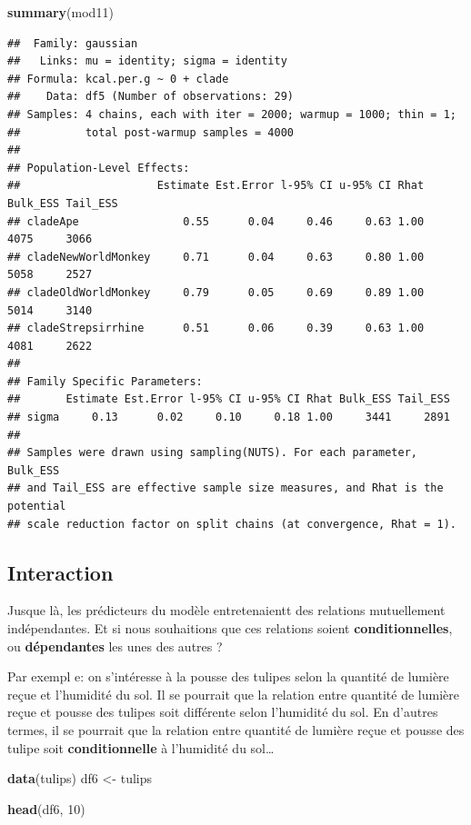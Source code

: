 \documentclass[
  a4paper,11pt,twoside,onecolumn,openright,final,oldfontcommands]{memoir}
\newenvironment{Shaded}{\begin{snugshade}}{\end{snugshade}}
\newcommand{\DecValTok}[1]{\textcolor[rgb]{0.00,0.00,0.81}{#1}}
\newcommand{\KeywordTok}[1]{\textcolor[rgb]{0.13,0.29,0.53}{\textbf{#1}}}
\newcommand{\NormalTok}[1]{#1}
\newcommand{\StringTok}[1]{\textcolor[rgb]{0.31,0.60,0.02}{#1}}
\theoremstyle{definition}
\theoremstyle{definition}
\theoremstyle{definition}
\theoremstyle{remark}
\begin{document}
\begin{Shaded}
\begin{Highlighting}[]
\KeywordTok{summary}\NormalTok{(mod11)}
\end{Highlighting}
\end{Shaded}

\begin{verbatim}
##  Family: gaussian 
##   Links: mu = identity; sigma = identity 
## Formula: kcal.per.g ~ 0 + clade 
##    Data: df5 (Number of observations: 29) 
## Samples: 4 chains, each with iter = 2000; warmup = 1000; thin = 1;
##          total post-warmup samples = 4000
## 
## Population-Level Effects: 
##                     Estimate Est.Error l-95% CI u-95% CI Rhat Bulk_ESS Tail_ESS
## cladeApe                0.55      0.04     0.46     0.63 1.00     4075     3066
## cladeNewWorldMonkey     0.71      0.04     0.63     0.80 1.00     5058     2527
## cladeOldWorldMonkey     0.79      0.05     0.69     0.89 1.00     5014     3140
## cladeStrepsirrhine      0.51      0.06     0.39     0.63 1.00     4081     2622
## 
## Family Specific Parameters: 
##       Estimate Est.Error l-95% CI u-95% CI Rhat Bulk_ESS Tail_ESS
## sigma     0.13      0.02     0.10     0.18 1.00     3441     2891
## 
## Samples were drawn using sampling(NUTS). For each parameter, Bulk_ESS
## and Tail_ESS are effective sample size measures, and Rhat is the potential
## scale reduction factor on split chains (at convergence, Rhat = 1).
\end{verbatim}

\hypertarget{interaction}{%
\subsection{Interaction}\label{interaction}}

Jusque là, les prédicteurs du modèle entretenaientt des relations mutuellement indépendantes. Et si nous souhaitions que ces relations soient \textbf{conditionnelles}, ou \textbf{dépendantes} les unes des autres ?

Par exempl e: on s'intéresse à la pousse des tulipes selon la quantité de lumière reçue et l'humidité du sol. Il se pourrait que la relation entre quantité de lumière reçue et pousse des tulipes soit différente selon l'humidité du sol. En d'autres termes, il se pourrait que la relation entre quantité de lumière reçue et pousse des tulipe soit \textbf{conditionnelle} à l'humidité du sol\ldots{}

\begin{Shaded}
\begin{Highlighting}[]
\KeywordTok{data}\NormalTok{(tulips)}
\NormalTok{df6 \textless{}{-}}\StringTok{ }\NormalTok{tulips}

\KeywordTok{head}\NormalTok{(df6, }\DecValTok{10}\NormalTok{)}
\end{Highlighting}
\end{Shaded}
\end{document}
